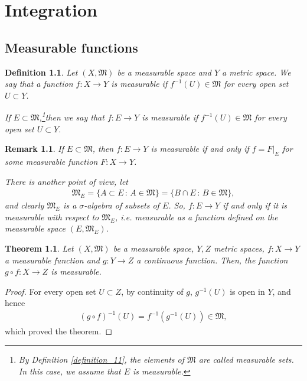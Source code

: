 \documentclass[11pt]{book}
\newtheorem{definition}{Definition}[chapter]
\newtheorem{theorem}{Theorem}[chapter]
\newtheorem{remark}{Remark}[chapter]
\theoremstyle{definition}
\numberwithin{equation}{chapter}
\begin{document}
\medskip














\chapter{Integration}

\section{Measurable functions}

\begin{definition}\label{def_21}
Let $(X,\mathfrak{M})$ be a measurable space and $Y$ a metric space. We say that a function $f:X \to Y$ is measurable if $f^{-1}(U) \in \mathfrak{M}$ for every open set $U \subset Y$.

If $E \subset \mathfrak{M}$,\footnote{By Definition \ref{definition_11}, the elements of $\mathfrak{M}$ are called measurable sets. In this case, we assume that $E$ is measurable.}then we say that $f:E \to Y$ is measurable if $f^{-1}(U) \in \mathfrak{M}$ for every open set $U \subset Y$.
\end{definition}

\medskip

\begin{remark}
If $E \subset \mathfrak{M}$, then $f:E \to Y$ is measurable if and only if $f = F|_E$ for some measurable function $F: X \to Y$. 

There is another point of view, let
\begin{align*}
    \mathfrak{M}_E = \{A \subset E\,:\, A \in \mathfrak{M} \} = \{B \cap E\,:\, B \in \mathfrak{M}\},
\end{align*}
and clearly $\mathfrak{M}_E$ is a $\sigma$-algebra of subsets of $E$. So, $f:E \to Y$ if and only if it is measurable with respect to $\mathfrak{M}_E$, i.e. measurable as a function defined on the measurable space $(E,\mathfrak{M}_E)$.
\end{remark}

\medskip

\begin{theorem}\label{theorem_21}
Let $(X,\mathfrak{M})$ be a measurable space, $Y,Z$ metric spaces, $f:X \to Y$ a measurable function and $g:Y \to Z$ a continuous function. Then, the function $g\circ f: X \to Z$ is measurable.
\end{theorem}
\begin{proof}
For every open set $U \subset Z$, by continuity of $g$, $g^{-1}(U)$ is open in $Y$, and hence
\begin{align*}
    (g\circ f)^{-1}(U) = f^{-1} \left(g^{-1}(U)\right) \in \mathfrak{M},
\end{align*}
which proved the theorem.
\end{proof}
\end{document}
